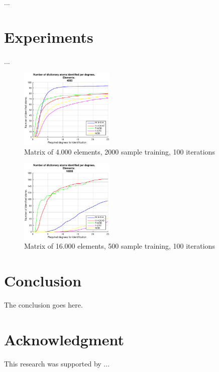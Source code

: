 \documentclass[conference]{IEEEtran}
\begin{document}
...

\section{Experiments}

...

\begin{figure}[!htb]
     \centering 
	 \includegraphics[width=0.4\textwidth]{figures/5_20_2000_4000_100.eps}
     \caption{Matrix of 4.000 elements, 2000 sample training, 100 iterations}
     \label{fig:facets_cross}
\end{figure}

\begin{figure}[!htb]
     \centering 
	 \includegraphics[width=0.4\textwidth]{figures/5_20_500_16000_100.eps}
     \caption{Matrix of 16.000 elements, 500 sample training, 100 iterations}
     \label{fig:facets_cross}
\end{figure}

\section{Conclusion}
The conclusion goes here.


\section*{Acknowledgment}
{\small This research was supported by ...}




\end{document}
